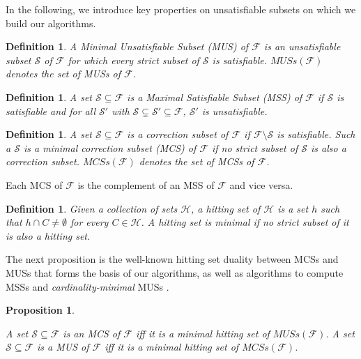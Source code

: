 \documentclass[twoside,11pt]{article}
\newcommand\m[1]{\mathcal{#1}}
\newtheorem{definition}[thm]{Definition}
\newtheorem{proposition}[propo]{Proposition}
\newcommand\F{\ensuremath{\m{F} }\xspace}
\newcommand\formula{\ensuremath{\m{F} }\xspace}
\newcommand\muses[1]{\ensuremath{\mathit{MUSs}(#1)}\xspace}
\newcommand\mcses[1]{\ensuremath{\mathit{MCSs}(#1)}\xspace}
\begin{document}
In the following, we introduce key properties on unsatisfiable subsets on which we build our algorithms.

\begin{definition}
A \emph{Minimal Unsatisfiable Subset} (MUS) of 
\F is an unsatisfiable subset $\m{S}$ of $\F$ for which every strict subset of $\m{S} $ is satisfiable. 
\muses{\F} denotes the set of MUSs of \F. 
\end{definition}


\begin{definition}
A set $\m{S} \subseteq \formula$ is a \emph{Maximal Satisfiable Subset} (MSS) of $ \formula$ if $\m{S}$ is satisfiable and for all $\m{S}'$ with $\m{S}  \subsetneq  \m{S}'\subseteq\formula $, $\m{S}'$ is unsatisfiable.
\end{definition}

\begin{definition}
A set $\m{S} \subseteq \formula$ is a \emph{correction subset} of \formula if $\formula\setminus\m{S}$ is satisfiable. 
Such a $\m{S}$ is a \emph{minimal correction subset} (MCS)  of \formula if no strict subset of $\m{S}$ is also a correction subset. 
\mcses{\F} denotes the set of MCSs of \F. 
\end{definition}

Each  MCS of \formula is the complement of an MSS of \formula and vice versa. 

\begin{definition}\label{def:minimal-hs}
Given a collection of sets $\m{H}$, a hitting set of $\m{H}$ is a set $h$ such that  $h \cap C \neq \emptyset$ for every $C \in \m{H}$. A hitting set is \emph{minimal} if no strict subset of it is also a hitting set.
\end{definition}


The next proposition is the well-known hitting set duality \cite{DBLP:journals/jar/LiffitonS08,ai/Reiter87}  between MCSs and MUSs that forms the basis of our algorithms, as well as algorithms to compute MSSs \cite{DBLP:conf/sat/DaviesB13} and \emph{cardinality-minimal} MUSs \cite{ignatiev2015smallest}.

\begin{proposition}\label{prop:MCS-MUS-hittingset}
	   
A set  $\m{S} \subseteq \formula$ is an MCS of $ \formula$ iff  it is a \emph{minimal hitting set} of \muses{\formula}.
A set  $\m{S} \subseteq \formula$ is a MUS of $ \formula$ iff  it is a \emph{minimal hitting set} of \mcses{\formula}.
\end{proposition}
\end{document}
